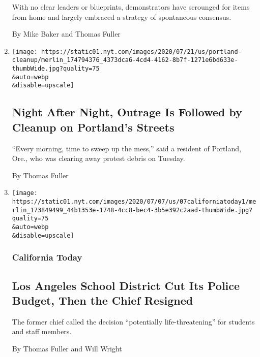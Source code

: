\begin{enumerate}
  With no clear leaders or blueprints, demonstrators have scrounged for
  items from home and largely embraced a strategy of spontaneous
  consensus.

  By Mike Baker and Thomas Fuller
\item
  \href{/2020/07/21/us/portland-protests-damage-cleanup.html}{}

  \texttt{[image: https://static01.nyt.com/images/2020/07/21/us/portland-cleanup/merlin\_174794376\_4373dca6-4cd4-4162-8b7f-1271e6bd633e-thumbWide.jpg?quality=75\\\&auto=webp\\\&disable=upscale]}

  \hypertarget{night-after-night-outrage-is-followed-by-cleanup-on-portlands-streets}{%
  \subsection{Night After Night, Outrage Is Followed by Cleanup on
  Portland's
  Streets}\label{night-after-night-outrage-is-followed-by-cleanup-on-portlands-streets}}

  ``Every morning, time to sweep up the mess,'' said a resident of
  Portland, Ore., who was clearing away protest debris on Tuesday.

  By Thomas Fuller
\item
  \href{/2020/07/07/us/los-angeles-school-police-budget-cuts.html}{}

  \texttt{[image: https://static01.nyt.com/images/2020/07/07/us/07californiatoday1/merlin\_173849499\_44b1353e-1748-4cc8-bec4-3b5e392c2aad-thumbWide.jpg?quality=75\\\&auto=webp\\\&disable=upscale]}

  \hypertarget{california-today}{%
  \subsubsection{California Today}\label{california-today}}

  \hypertarget{los-angeles-school-district-cut-its-police-budget-then-the-chief-resigned}{%
  \subsection{Los Angeles School District Cut Its Police Budget, Then
  the Chief
  Resigned}\label{los-angeles-school-district-cut-its-police-budget-then-the-chief-resigned}}

  The former chief called the decision ``potentially life-threatening''
  for students and staff members.

  By Thomas Fuller and Will Wright
\end{enumerate}

